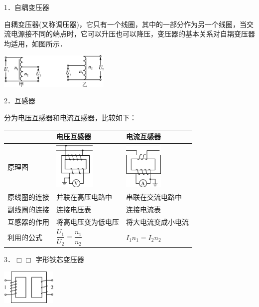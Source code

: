 1．自耦变压器

自耦变压器(又称调压器)，它只有一个线圈，其中的一部分作为另一个线圈，当交流电源接不同的端点时，它可以升压也可以降压，变压器的基本关系对自耦变压器均适用，如图所示．

\begin{center}\includegraphics[width=2.08472in,height=0.65069in]{media/image455.png}\end{center}

2．互感器

分为电压互感器和电流互感器，比较如下：

\begin{longtable}[]{@{}m{2.2cm}m{4cm}m{4cm}@{}}
\toprule
& 电压互感器 & 电流互感器\tabularnewline
\midrule
\endhead
原理图 &
\includegraphics[width=0.76389in,height=0.87708in]{media/image458.png} &
\includegraphics[width=0.72639in,height=0.88681in]{media/image459.png}\tabularnewline
原线圈的连接 & 并联在高压电路中 & 串联在交流电路中\tabularnewline
副线圈的连接 & 连接电压表 & 连接电流表\tabularnewline
互感器的作用 & 将高电压变为低电压 & 将大电流变成小电流\tabularnewline
利用的公式 & $\dfrac{U_{1}}{U_{2}}=\dfrac{n_{1}}{n_{2}}$ & $I_{1} n_{1}=I_{2} n_{2}$\tabularnewline
\bottomrule
\end{longtable}




3．$\Box\Box$ 字形铁芯变压器
\begin{center}\includegraphics[width=1.02847in,height=0.65069in]{media/image461.png}\end{center}

